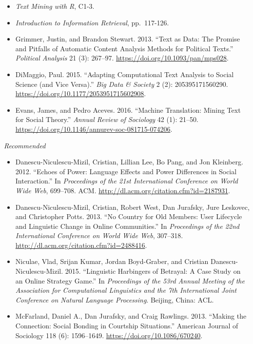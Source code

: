 \documentclass[
  10pt,
]{article}
\providecommand{\tightlist}{%
  \setlength{\itemsep}{0pt}\setlength{\parskip}{0pt}}
\begin{document}
\begin{itemize}
\tightlist
\item
  \emph{Text Mining with R}, C1-3.
\item
  \emph{Introduction to Information Retrieval}, pp.~117-126.
\item
  Grimmer, Justin, and Brandon Stewart. 2013. ``Text as Data: The
  Promise and Pitfalls of Automatic Content Analysis Methods for
  Political Texts.'' \emph{Political Analysis} 21 (3): 267--97.
  \url{https://doi.org/10.1093/pan/mps028}.
\item
  DiMaggio, Paul. 2015. ``Adapting Computational Text Analysis to Social
  Science (and Vice Versa).'' \emph{Big Data \& Society} 2 (2):
  205395171560290. \url{https://doi.org/10.1177/2053951715602908}.
\item
  Evans, James, and Pedro Aceves. 2016. ``Machine Translation: Mining
  Text for Social Theory.'' \emph{Annual Review of Sociology} 42 (1):
  21--50. \url{https://doi.org/10.1146/annurev-soc-081715-074206}.
\end{itemize}

\emph{Recommended}

\begin{itemize}
\tightlist
\item
  Danescu-Niculescu-Mizil, Cristian, Lillian Lee, Bo Pang, and Jon
  Kleinberg. 2012. ``Echoes of Power: Language Effects and Power
  Differences in Social Interaction.'' In \emph{Proceedings of the 21st
  International Conference on World Wide Web}, 699--708. ACM.
  \url{http://dl.acm.org/citation.cfm?id=2187931}.
\item
  Danescu-Niculescu-Mizil, Cristian, Robert West, Dan Jurafsky, Jure
  Leskovec, and Christopher Potts. 2013. ``No Country for Old Members:
  User Lifecycle and Linguistic Change in Online Communities.'' In
  \emph{Proceedings of the 22nd International Conference on World Wide
  Web}, 307--318. \url{http://dl.acm.org/citation.cfm?id=2488416}.
\item
  Niculae, Vlad, Srijan Kumar, Jordan Boyd-Graber, and Cristian
  Danescu-Niculescu-Mizil. 2015. ``Linguistic Harbingers of Betrayal: A
  Case Study on an Online Strategy Game.'' In \emph{Proceedings of the
  53rd Annual Meeting of the Association for Computational Linguistics
  and the 7th International Joint Conference on Natural Language
  Processing}. Beijing, China: ACL.
\item
  McFarland, Daniel A., Dan Jurafsky, and Craig Rawlings. 2013. ``Making
  the Connection: Social Bonding in Courtship Situations.'' American
  Journal of Sociology 118 (6): 1596--1649.
  \url{https://doi.org/10.1086/670240}.
\end{itemize}
\end{document}
